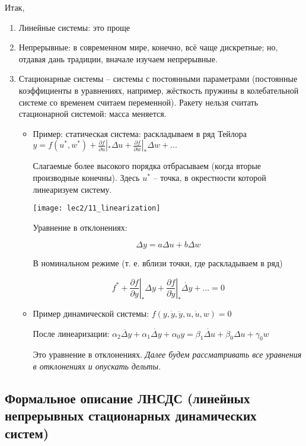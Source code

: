 \documentclass[main.tex]{subfiles}
\begin{document}
Итак,
\begin{enumerate}[noitemsep]
	\item Линейные системы: это проще
	\item Непрерывные: в современном мире, конечно, всё чаще дискретные; но, отдавая дань традиции, вначале изучаем непрерывные.
	\item Стационарные системы -- системы с постоянными параметрами (постоянные коэффициенты в уравнениях, например, жёсткость пружины в колебательной системе со временем считаем переменной).
	Ракету нельзя считать стационарной системой: масса меняется.

	\begin{itemize}[noitemsep]
		\item Пример: статическая система: раскладываем в ряд Тейлора $ y = f(u^*, w^*) + \frac{\partial f}{\partial u} |_* \Delta u + \frac{\partial f}{\partial w} |_* \Delta w + ... $

		Слагаемые более высокого порядка отбрасываем (когда вторые производные конечны).
        Здесь $ u^* $ -- точка, в окрестности которой линеаризуем систему.

        \texttt{[image: lec2/11\_linearization]}

        Уравнение в отклонениях:

        \[ \Delta y = a \Delta u + b \Delta w \]

        В номинальном режиме (т. е. вблизи точки, где раскладываем в ряд)

        \[ f^* +  \left. \frac{\partial f}{\partial y}\right|_* \Delta y + \left. \frac{\partial f}{\partial \dot y} \right|_* \dot{\Delta y} + ... = 0 \]

		\item Пример динамической системы: $ f(y, \dot y, \ddot y, u,  \dot u, w) = 0 $

		После линеаризации: $ \alpha_2 \ddot{\Delta y} + \alpha_1 \dot{\Delta y} + \alpha_0 y = \beta_1 \dot{\Delta u} + \beta_0 \Delta u + \gamma_0 w $

		Это уравнение в отклонениях. \emph{Далее будем рассматривать все уравнения в отклонениях и опускать дельты.}
	\end{itemize}

\end{enumerate}

\subsection{Формальное описание ЛНСДС (линейных непрерывных стационарных динамических систем)}
\end{document}
